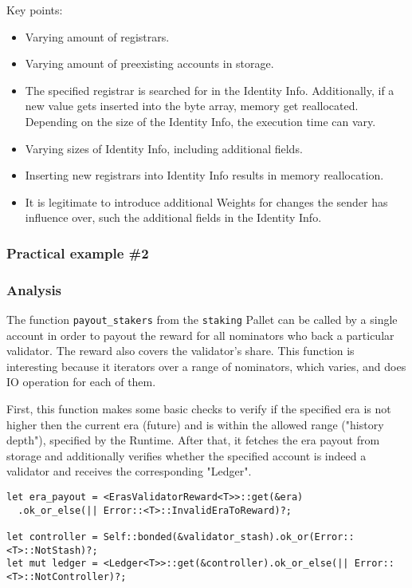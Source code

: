 \documentclass[11pt,a4paper]{article}
\begin{document}
Key points:
\begin{itemize}
  \item Varying amount of registrars.
  \item Varying amount of preexisting accounts in storage.
  \item The specified registrar is searched for in the Identity Info. Additionally, if a new value gets
  inserted into the byte array, memory get reallocated. Depending on the size of the Identity Info, the
  execution time can vary.
  \item Varying sizes of Identity Info, including additional fields.
  \item Inserting new registrars into Identity Info results in memory reallocation.
  \item It is legitimate to introduce additional Weights for changes the sender has influence over,
  such the additional fields in the Identity Info.
\end{itemize}

\subsubsection{Practical example \#2}

\subsubsection*{Analysis}

The function \verb|payout_stakers| from the \verb|staking| Pallet can be called by a single account in order
to payout the reward for all nominators who back a particular validator. The reward also covers the validator's
share. This function is interesting because it iterators over a range of nominators, which varies, and does
IO operation for each of them.
\newline

First, this function makes some basic checks to verify if the specified era is not higher then the current era
(future) and is within the allowed range ("history depth"), specified by the Runtime.
After that, it fetches the era payout from storage
and additionally verifies whether the specified account is indeed a validator and receives the corresponding
"Ledger".

\begin{verbatim}
let era_payout = <ErasValidatorReward<T>>::get(&era)
  .ok_or_else(|| Error::<T>::InvalidEraToReward)?;

let controller = Self::bonded(&validator_stash).ok_or(Error::<T>::NotStash)?;
let mut ledger = <Ledger<T>>::get(&controller).ok_or_else(|| Error::<T>::NotController)?;
\end{verbatim}
\end{document}
